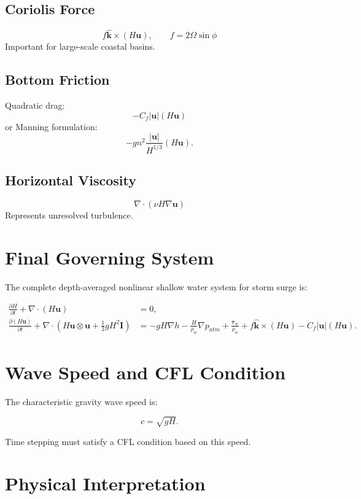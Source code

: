\documentclass[11pt]{article}
\begin{document}
\subsection*{Coriolis Force}
\[
f \hat{\bm{k}} \times (H\bm{u}),
\qquad
f = 2 \Omega \sin\phi
\]
Important for large-scale coastal basins.

\subsection*{Bottom Friction}
Quadratic drag:
\[
- C_f |\bm{u}| (H\bm{u})
\]
or Manning formulation:
\[
- g n^2 \frac{|\bm{u}|}{H^{1/3}} (H\bm{u}).
\]

\subsection*{Horizontal Viscosity}
\[
\nabla \cdot (\nu H \nabla \bm{u})
\]
Represents unresolved turbulence.

\section{Final Governing System}

The complete depth-averaged nonlinear shallow water system for storm surge is:

\begin{equation}
\boxed{
\begin{aligned}
\frac{\partial H}{\partial t}
+
\nabla \cdot (H\bm{u})
&= 0, \\
\frac{\partial (H\bm{u})}{\partial t}
+
\nabla \cdot
\left(
H\bm{u}\otimes\bm{u}
+
\frac{1}{2} g H^2 \bm{I}
\right)
&=
- g H \nabla h
- \frac{H}{\rho_w} \nabla p_{atm}
+ \frac{\bm{\tau}_w}{\rho_w}
+ f \hat{\bm{k}} \times (H\bm{u})
- C_f |\bm{u}| (H\bm{u}).
\end{aligned}
}
\end{equation}

\section{Wave Speed and CFL Condition}

The characteristic gravity wave speed is:

\[
c = \sqrt{gH}.
\]

Time stepping must satisfy a CFL condition based on this speed.

\section{Physical Interpretation}
\end{document}
